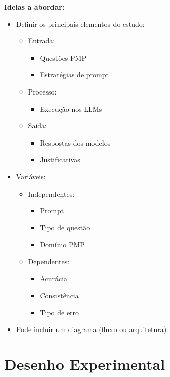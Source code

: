 \textbf{Ideias a abordar:}
\begin{itemize}
    \item Definir os principais elementos do estudo:
    \begin{itemize}
        \item Entrada:
        \begin{itemize}
            \item Questões PMP
            \item Estratégias de prompt
        \end{itemize}
        \item Processo:
        \begin{itemize}
            \item Execução nos LLMs
        \end{itemize}
        \item Saída:
        \begin{itemize}
            \item Respostas dos modelos
            \item Justificativas
        \end{itemize}
    \end{itemize}
    \item Variáveis:
    \begin{itemize}
        \item Independentes:
        \begin{itemize}
            \item Prompt
            \item Tipo de questão
            \item Domínio PMP
        \end{itemize}
        \item Dependentes:
        \begin{itemize}
            \item Acurácia
            \item Consistência
            \item Tipo de erro
        \end{itemize}
    \end{itemize}
    \item Pode incluir um diagrama (fluxo ou arquitetura)
\end{itemize}



\section{Desenho Experimental}
\label{subsec:desenho_exp}

